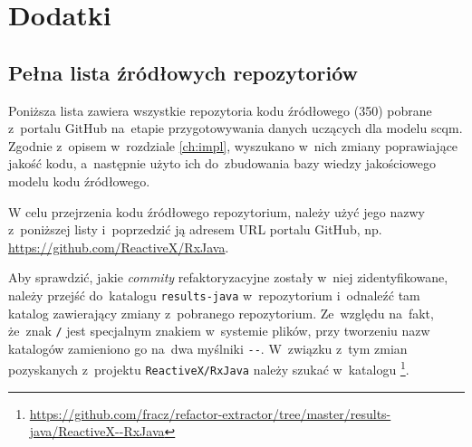 \documentclass[twoside]{praca}
\begin{document}
\printglossary[title={Spis akronimów},nonumberlist]

\clearpage
{}
\printbibliography

\clearpage

\chapter*{Dodatki}

\appendix
{}
\renewcommand{\thesection}{\Alph{section}}
\section{Pełna lista źródłowych repozytoriów}
\label{apdx:full_repo_list}

Poniższa lista zawiera wszystkie repozytoria kodu źródłowego (350) pobrane z~portalu GitHub na~etapie przygotowywania danych uczących dla modelu \gls{scqm}. Zgodnie z~opisem w~rozdziale \ref{ch:impl}, wyszukano w~nich zmiany poprawiające jakość kodu, a~następnie użyto ich do~zbudowania bazy wiedzy jakościowego modelu kodu źródłowego.

W celu przejrzenia kodu źródłowego repozytorium, należy użyć jego nazwy z~poniższej listy i~poprzedzić ją adresem URL portalu GitHub, np. \url{https://github.com/ReactiveX/RxJava}.

Aby sprawdzić, jakie \textit{commity} refaktoryzacyjne zostały w~niej zidentyfikowane, należy przejść do~katalogu \texttt{results-java} w~repozytorium \cite{fracz:refactor-extractor} i~odnaleźć tam katalog zawierający zmiany z~pobranego repozytorium. Ze~względu na~fakt, że~znak \texttt{/} jest specjalnym znakiem w~systemie plików,
przy tworzeniu nazw katalogów zamieniono go na~dwa myślniki \texttt{-{}-}. W~związku z~tym zmian pozyskanych z~projektu \texttt{ReactiveX/RxJava} należy szukać w~katalogu \footnote{\url{https://github.com/fracz/refactor-extractor/tree/master/results-java/ReactiveX--RxJava}}. 
\end{document}
